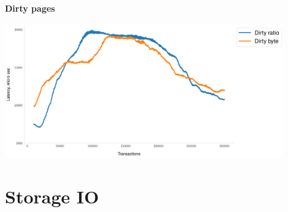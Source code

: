 \documentclass[usenames,dvipsnames, 18pt, compress, aspectratio=169]{beamer}
\begin{document}
\begin{frame}
    \frametitle{}
    \begin{center}
    \textbf{Dirty pages}

    \includegraphics[width=0.9\textwidth,center]{checkpoint_dirty_pages_2.png}

    \end{center}
\end{frame}

\fontsize{13pt}{14}\selectfont
\section{Storage IO}
\fontsize{17pt}{18}\selectfont
\end{document}
